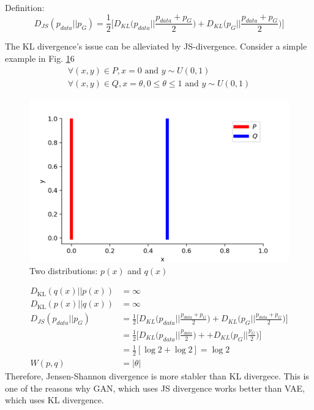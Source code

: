 Definition:
$$D_{JS}(p_{data}||p_{G}) = \frac{1}{2}\Bigg[D_{KL}\Big(p_{data}\Big|\Big|\frac{p_{data}+p_{G}}{2}\Big)+D_{KL}\Big(p_{G}\Big|\Big|\frac{p_{data}+p_{G}}{2}\Big)\Bigg]$$

The KL divergence's issue can be alleviated by JS-divergence. Consider a simple example in Fig. \ref{fig:wassersteinexample}6
\begin{align*}
	\forall (x, y) \in P, x = 0 \text{ and } y \sim U(0, 1)\\
	\forall (x, y) \in Q, x = \theta, 0 \leq \theta \leq 1 \text{ and } y \sim U(0, 1)
\end{align*}

\begin{figure}[h]
	\begin{center}
		\includegraphics[scale=0.25]{./images/generative/gan/wassersteinexample.png}
	\end{center}
	\caption{Two distributions: $p(x)$ and $q(x)$}
	\label{fig:wassersteinexample}
\end{figure}

\begin{align*}
	D_\textrm{KL}(q(x)||p(x)) &= \infty\\
	D_\textrm{KL}(p(x)||q(x)) &= \infty\\
	D_{JS}(p_{data}||p_{G}) &= \frac{1}{2}\Bigg[D_{KL}\Big(p_{data}\Big|\Big|\frac{p_{data}+p_{G}}{2}\Big)+D_{KL}\Big(p_{G}\Big|\Big|\frac{p_{data}+p_{G}}{2}\Big)\Bigg]\\
	& = \frac{1}{2}\Bigg[D_{KL}\Big(p_{data}\Big|\Big|\frac{p_{data}}{2}\Big)++D_{KL}\Big(p_{G}\Big|\Big|\frac{p_{G}}{2}\Big)\Bigg]\\
	& = \frac{1}{2}[\log 2 + \log 2] = \log 2\\
	W(p,q) & = |\theta|
\end{align*}
Therefore, Jensen-Shannon divergence is more stabler than KL divergece. This is one of the reasons why GAN, which uses JS divergence works better than VAE, which uses KL divergence. 

